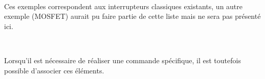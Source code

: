 {{%


~\

Ces exemples correspondent aux interrupteurs \og classiques \fg existants, un autre exemple (MOSFET) aurait pu faire partie de cette liste mais ne sera pas présenté ici.

~\

Lorsqu'il est nécessaire de réaliser une commande spécifique, il est toutefois possible d'associer ces éléments.
}}

